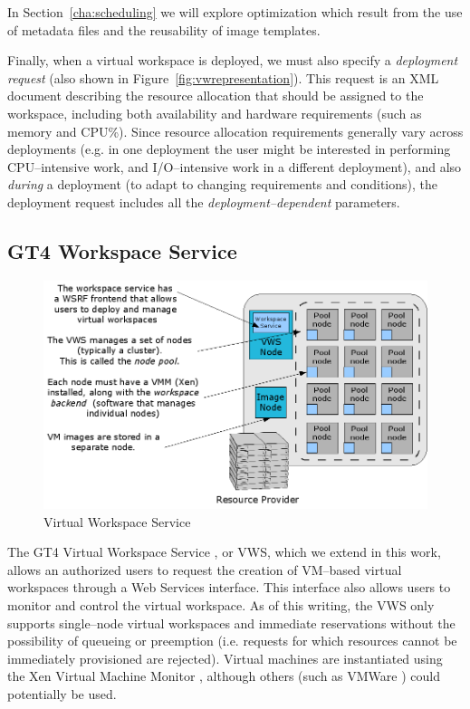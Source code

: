 \documentclass[singlespace]{ccw_chithesis}
\begin{document}
In Section~\ref{cha:scheduling} we will explore optimization which result from the use of metadata files and the reusability of image templates.

Finally, when a virtual workspace is deployed, we must also specify a \emph{deployment request} (also shown in Figure~\ref{fig:vwrepresentation}). This request is an XML document describing the resource
allocation that should be assigned to the workspace, including both availability and hardware requirements (such as memory and
CPU\%). Since resource allocation requirements generally vary across deployments (e.g. in one deployment the user might be interested in performing CPU--intensive work, and I/O--intensive work in a different deployment), and also \emph{during} a deployment (to adapt to changing requirements and conditions), the deployment request includes all the \emph{deployment--dependent} parameters.


\subsection{GT4 Workspace Service}

\begin{figure}
  \begin{center}
    \includegraphics[width=\textwidth]{figures/vw_overview.png}
    \caption{Virtual Workspace Service}
	\label{fig:vwservice}
  \end{center}
\end{figure}


The GT4 Virtual Workspace Service \cite{vwsweb}, or VWS, which we extend in this work, allows an authorized users to request the creation of VM--based virtual workspaces through a Web Services interface. This interface also allows users to monitor and control the virtual workspace. As of this writing, the VWS only supports single--node virtual workspaces and immediate reservations without the possibility of queueing or preemption (i.e. requests for which resources cannot be immediately provisioned are rejected). Virtual machines are instantiated using the Xen Virtual Machine Monitor \cite{xen}, although others (such as VMWare \cite{vmwareweb}) could potentially be used.
\end{document}

